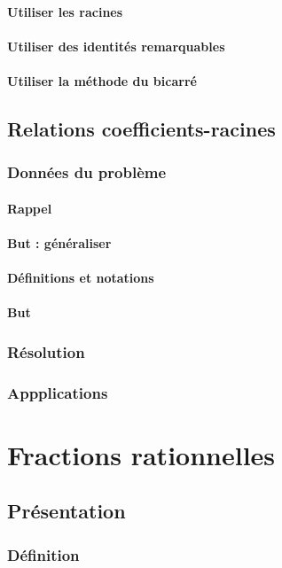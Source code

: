 \documentclass[12pt,a4paper,french]{book}
\begin{document}
			\subsubsection{Utiliser les racines}
			\subsubsection{Utiliser des identités remarquables}
			\subsubsection{Utiliser la méthode du bicarré}
	\section{Relations coefficients-racines}
		\subsection{Données du problème}
			\subsubsection{Rappel}
			\subsubsection{But : généraliser}
			\subsubsection{Définitions et notations}
			\subsubsection{But}
		\subsection{Résolution}
		\subsection{Appplications}
		
\chapter{Fractions rationnelles}
	\section{Présentation}
		\subsection{Définition}
\end{document}
